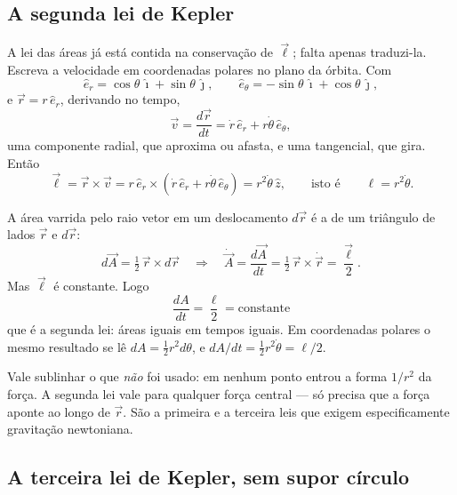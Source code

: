\documentclass[11pt,a4paper]{article}
\begin{document}
\subsection*{A segunda lei de Kepler}

A lei das áreas já está contida na conservação de $\vec{\ell}$; falta apenas traduzi-la. Escreva a velocidade
em coordenadas polares no plano da órbita. Com
\[
\hat{e}_r=\cos\theta\,\hat{\imath}+\sin\theta\,\hat{\jmath},
\qquad
\hat{e}_\theta=-\sin\theta\,\hat{\imath}+\cos\theta\,\hat{\jmath},
\]
e $\vec{r}=r\,\hat{e}_r$, derivando no tempo,
\[
\vec{v}=\frac{d\vec{r}}{dt}=\dot{r}\,\hat{e}_r+r\dot{\theta}\,\hat{e}_\theta,
\]
uma componente radial, que aproxima ou afasta, e uma tangencial, que gira. Então
\[
\vec{\ell}=\vec{r}\times\vec{v}=r\,\hat{e}_r\times\left(\dot{r}\,\hat{e}_r+r\dot{\theta}\,\hat{e}_\theta\right)
=r^{2}\dot{\theta}\,\hat{z},
\qquad\text{isto é}\qquad
\ell=r^{2}\dot{\theta}.
\]

A área varrida pelo raio vetor em um deslocamento $d\vec{r}$ é a de um triângulo de lados $\vec{r}$ e
$d\vec{r}$:
\[
d\vec{A}=\tfrac{1}{2}\,\vec{r}\times d\vec{r}
\quad\Longrightarrow\quad
\dot{\vec{A}}=\frac{d\vec{A}}{dt}=\tfrac{1}{2}\,\vec{r}\times\dot{\vec{r}}=\frac{\vec{\ell}}{2}.
\]
Mas $\vec{\ell}$ é constante. Logo
\[
\boxed{\ \frac{dA}{dt}=\frac{\ell}{2}=\text{constante}\ }
\]
que é a segunda lei: áreas iguais em tempos iguais. Em coordenadas polares o mesmo resultado se lê
$dA=\tfrac{1}{2}r^{2}d\theta$, e $dA/dt=\tfrac{1}{2}r^{2}\dot{\theta}=\ell/2$.

Vale sublinhar o que \emph{não} foi usado: em nenhum ponto entrou a forma $1/r^{2}$ da força. A segunda lei
vale para qualquer força central --- só precisa que a força aponte ao longo de $\vec{r}$. São a primeira e a
terceira leis que exigem especificamente gravitação newtoniana.

\subsection*{A terceira lei de Kepler, sem supor círculo}
\end{document}
